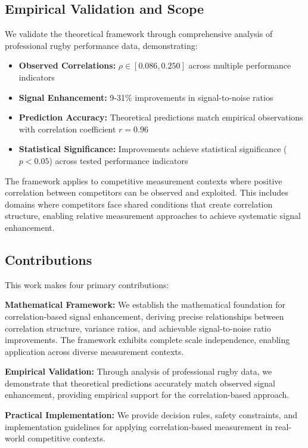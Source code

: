 \subsection{Empirical Validation and Scope}

We validate the theoretical framework through comprehensive analysis of professional rugby performance data, demonstrating:

\begin{itemize}
    \item \textbf{Observed Correlations:} $\rho \in [0.086, 0.250]$ across multiple performance indicators
    \item \textbf{Signal Enhancement:} 9-31\% improvements in signal-to-noise ratios  
    \item \textbf{Prediction Accuracy:} Theoretical predictions match empirical observations with correlation coefficient $r = 0.96$
    \item \textbf{Statistical Significance:} Improvements achieve statistical significance ($p < 0.05$) across tested performance indicators
\end{itemize}

The framework applies to competitive measurement contexts where positive correlation between competitors can be observed and exploited. This includes domains where competitors face shared conditions that create correlation structure, enabling relative measurement approaches to achieve systematic signal enhancement.

\subsection{Contributions}

This work makes four primary contributions:

\textbf{Mathematical Framework:} We establish the mathematical foundation for correlation-based signal enhancement, deriving precise relationships between correlation structure, variance ratios, and achievable signal-to-noise ratio improvements. The framework exhibits complete scale independence, enabling application across diverse measurement contexts.

\textbf{Empirical Validation:} Through analysis of professional rugby data, we demonstrate that theoretical predictions accurately match observed signal enhancement, providing empirical support for the correlation-based approach.

\textbf{Practical Implementation:} We provide decision rules, safety constraints, and implementation guidelines for applying correlation-based measurement in real-world competitive contexts.

